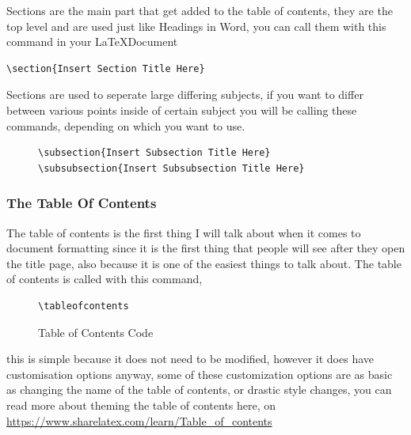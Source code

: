 \documentclass[12pt, letterpaper, oneside]{article} \usepackage[utf8]{inputenc}
\begin{document}
Sections are the main part that get added to the table of contents, they are the top level and are used just like Headings in Word, you can call them with this command in your \LaTeX Document
\begin{lstlisting}
\section{Insert Section Title Here}
\end{lstlisting}

Sections are used to seperate large differing subjects, if you want to differ between various points inside of certain subject you will be calling these commands, depending on which you want to use. 

\begin{figure}[H]
\begin{lstlisting}
\subsection{Insert Subsection Title Here}
\subsubsection{Insert Subsubsection Title Here}
\end{lstlisting}
\end{figure}



\subsubsection{The Table Of Contents}

The table of contents is the first thing I will talk about when it comes to document formatting since it is the first thing that people will see after they open the title page, also because it is one of the easiest things to talk about.
The table of contents is called with this command,

\begin{minipage}{\linewidth}%
 \begin{figure}[H]
\begin{lstlisting}
\tableofcontents
\end{lstlisting}
	\caption{Table of Contents Code}
\end{figure}
\end{minipage}
this is simple because it does not need to be modified, however it does have customisation options anyway, some of these customization options are as basic as changing the name of the table of contents, or drastic style changes, you can read more about theming the table of contents here, on \href{ShareLaTeX}{https://www.sharelatex.com/learn/Table\_of\_contents}
\end{document}
